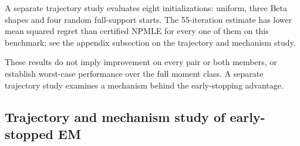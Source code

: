 A separate trajectory study evaluates eight initializations: uniform, three
Beta shapes and four random full-support starts.  The 55-iteration estimate
has lower mean squared regret than certified NPMLE for every one of them on
this benchmark; see the appendix subsection on the trajectory and mechanism
study.


These results do not imply improvement on every pair or both members, or
establish worst-case performance over the full moment class.  A separate
trajectory study examines a mechanism behind the early-stopping advantage.


\subsection{Trajectory and mechanism study of early-stopped EM}


